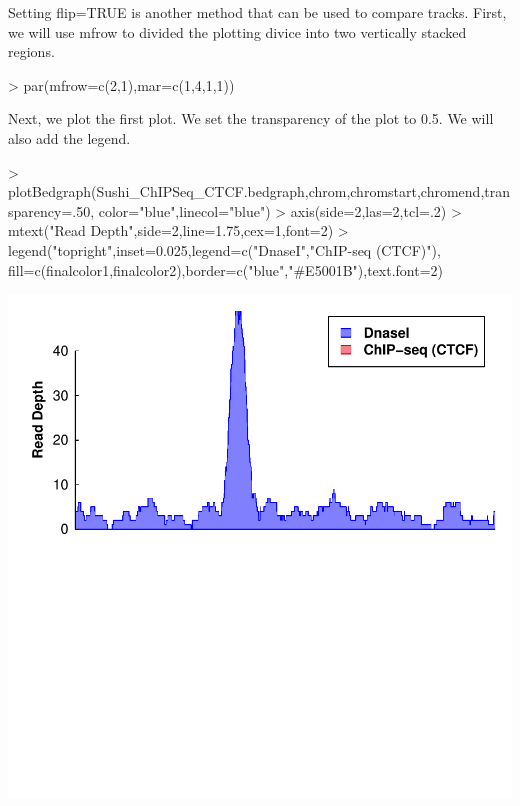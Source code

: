 \documentclass{article}
\begin{document}
Setting flip=TRUE is another method that can be used to compare tracks.  First, we will use mfrow to divided the plotting divice into two vertically stacked regions.

\begin{center}
\begin{Schunk}
\begin{Sinput}
> par(mfrow=c(2,1),mar=c(1,4,1,1))
\end{Sinput}
\end{Schunk}
\end{center}

Next, we plot the first plot.  We set the transparency of the plot to 0.5. We will also add the legend.

\begin{center}
\begin{Schunk}
\begin{Sinput}
> plotBedgraph(Sushi_ChIPSeq_CTCF.bedgraph,chrom,chromstart,chromend,transparency=.50,
              color="blue",linecol="blue")
> axis(side=2,las=2,tcl=.2)
> mtext("Read Depth",side=2,line=1.75,cex=1,font=2)
> legend("topright",inset=0.025,legend=c("DnaseI","ChIP-seq (CTCF)"),
        fill=c(finalcolor1,finalcolor2),border=c("blue","#E5001B"),text.font=2)
\end{Sinput}
\end{Schunk}
\end{center}


\begin{center}
\includegraphics{Sushi-015}
\end{center}
\end{document}
